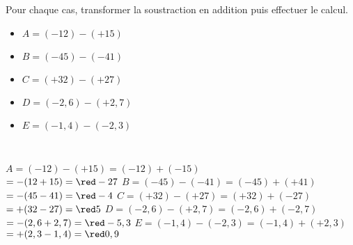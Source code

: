 \begin{exercice*}
   Pour chaque cas, transformer la soustraction en addition puis effectuer le calcul.
   \begin{itemize}
      \item[] $A =(-12)-(+15)$
      \item[] $B =(-45)-(-41)$
      \item[] $C =(+32)-(+27)$
      \item[] $D =(-2,6)-(+2,7)$
      \item[] $E =(-1,4)-(-2,3)$
   \end{itemize}
\end{exercice*}

\begin{corrige}
   \ \\ [-5mm]
   \begin{itemize}
      \def\item{}
      \item $A =(-12)-(+15)=(-12)+(-15)$ \\
         \qquad\; $=-(12+15) =\red -27$
      \item $B =(-45)-(-41) =(-45)+(+41)$ \\
         \qquad\; $=-(45-41) =\red -4$
      \item $C =(+32)-(+27) =(+32)+(-27)$ \\
         \qquad\; $=+(32-27) =\red 5$
      \item $D =(-2,6)-(+2,7) =(-2,6)+(-2,7)$ \\
         \qquad\; $=-(2,6+2,7) =\red -5,3$
      \item $E =(-1,4)-(-2,3) =(-1,4)+(+2,3)$ \\
         \qquad\; $=+(2,3-1,4) =\red 0,9$
   \end{itemize}
\end{corrige}
